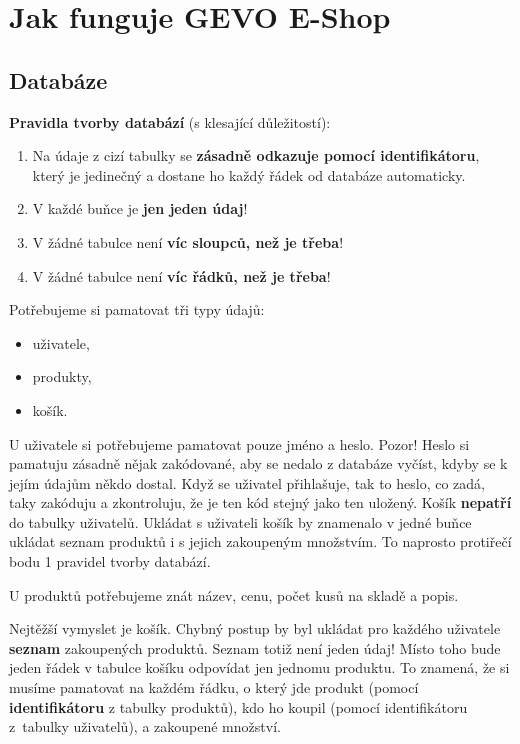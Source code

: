 \documentclass[a4paper,11pt]{article}
\begin{document}
\thispagestyle{fancy}

\section{Jak funguje GEVO E-Shop}
\label{sec:jak-funguje-e-shop}

\subsection{Databáze}
\label{ssec:databaze}

\textbf{Pravidla tvorby databází} (s klesající důležitostí):
\begin{enumerate}[topsep=0pt]
 \item Na údaje z cizí tabulky se \textbf{zásadně odkazuje pomocí
  identifikátoru}, který je jedinečný a dostane ho každý řádek od databáze
  automaticky.
 \item V každé buňce je \textbf{jen jeden údaj}!
 \item V žádné tabulce není \textbf{víc sloupců, než je třeba}!
 \item V žádné tabulce není \textbf{víc řádků, než je třeba}!
\end{enumerate}

Potřebujeme si pamatovat tři typy údajů:
\begin{itemize}[topsep=0pt]
 \item uživatele,
 \item produkty,
 \item košík.
\end{itemize}

U uživatele si potřebujeme pamatovat pouze jméno a heslo. Pozor! Heslo si
pamatuju zásadně nějak zakódované, aby se nedalo z databáze vyčíst, kdyby se k
jejím údajům někdo dostal. Když se uživatel přihlašuje, tak to heslo, co zadá,
taky zakóduju a zkontroluju, že je ten kód stejný jako ten uložený. Košík
\textbf{nepatří} do tabulky uživatelů. Ukládat s uživateli košík by znamenalo v
jedné buňce ukládat seznam produktů i s jejich za\-koupeným množstvím. To
naprosto protiřečí bodu 1 pravidel tvorby databází.

U produktů potřebujeme znát název, cenu, počet kusů na skladě a popis.

Nejtěžší vymyslet je košík. Chybný postup by byl ukládat pro každého uživatele
\textbf{seznam} za\-koupených produktů. Seznam totiž není jeden údaj! Místo toho
bude jeden řádek v tabulce košíku odpovídat jen jednomu produktu. To znamená, že
si musíme pamatovat na každém řádku, o který jde produkt (pomocí
\textbf{identifikátoru} z tabulky produktů), kdo ho koupil (pomocí
identifikátoru z~tabulky uživatelů), a zakoupené množství.
\end{document}
